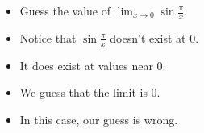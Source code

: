 \begin{frame}
\begin{example}[Example 4, p. 98]
\begin{columns}[c]
\begin{itemize}
\item  Guess the value of $\lim_{x\rightarrow 0}\sin\frac{\pi}{x}$.
\item<2->  Notice that $\sin\frac{\pi}{x}$ doesn't exist at $0$.  
\item<3->  It does exist at values near $0$.
\item<5->  We guess that the limit is $0$. 
\item<6->  In this case, our guess is \alert<6>{wrong}.
\end{itemize}

\end{columns}
\end{example}
\end{frame}
